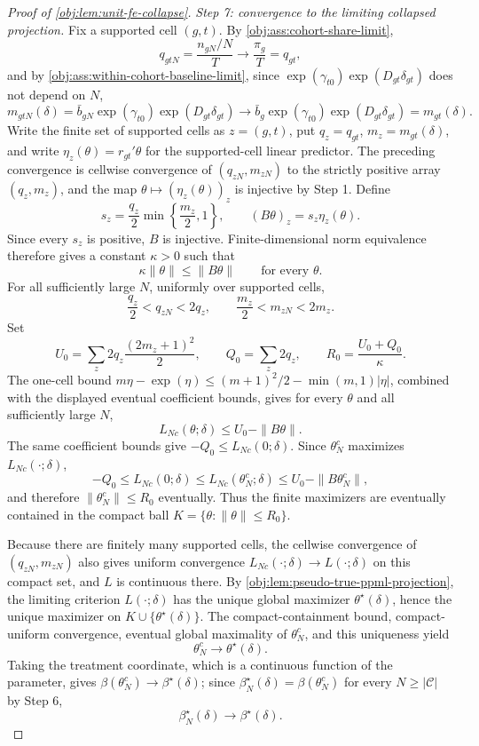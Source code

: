 \begin{proof}[Proof of \cref{obj:lem:unit-fe-collapse}]
\textit{Step 7: convergence to the limiting collapsed projection.} Fix a supported cell \((g,t)\). By \cref{obj:ass:cohort-share-limit},
\[
q_{gtN}=\frac{n_{gN}/N}{T}\longrightarrow \frac{\pi_g}{T}=q_{gt},
\]
and by \cref{obj:ass:within-cohort-baseline-limit}, since \(\exp(\gamma_{t0})\exp(D_{gt}\delta_{gt})\) does not depend on \(N\),
\[
m_{gtN}(\delta)=\bar b_{gN}\exp(\gamma_{t0})\exp(D_{gt}\delta_{gt})
\longrightarrow
\bar b_g\exp(\gamma_{t0})\exp(D_{gt}\delta_{gt})=m_{gt}(\delta).
\]
Write the finite set of supported cells as \(z=(g,t)\), put \(q_z=q_{gt}\), \(m_z=m_{gt}(\delta)\), and write \(\eta_z(\theta)=r_{gt}'\theta\) for the supported-cell linear predictor. The preceding convergence is cellwise convergence of \((q_{zN},m_{zN})\) to the strictly positive array \((q_z,m_z)\), and the map \(\theta\mapsto(\eta_z(\theta))_z\) is injective by Step 1. Define
\[
s_z=\frac{q_z}{2}\min\!\left\{\frac{m_z}{2},1\right\},
\qquad
(B\theta)_z=s_z\eta_z(\theta) .
\]
Since every \(s_z\) is positive, \(B\) is injective. Finite-dimensional norm equivalence therefore gives a constant \(\kappa>0\) such that
\[
\kappa\|\theta\|\le \|B\theta\|
\qquad\text{for every }\theta .
\]
For all sufficiently large \(N\), uniformly over supported cells,
\[
\frac{q_z}{2}<q_{zN}<2q_z,
\qquad
\frac{m_z}{2}<m_{zN}<2m_z .
\]
Set
\[
U_0=\sum_z 2q_z\frac{(2m_z+1)^2}{2},
\qquad
Q_0=\sum_z 2q_z,
\qquad
R_0=\frac{U_0+Q_0}{\kappa}.
\]
The one-cell bound \(m\eta-\exp(\eta)\le (m+1)^2/2-\min(m,1)|\eta|\), combined with the displayed eventual coefficient bounds, gives for every \(\theta\) and all sufficiently large \(N\),
\[
L_{Nc}(\theta;\delta)\le U_0-\|B\theta\|.
\]
The same coefficient bounds give \(-Q_0\le L_{Nc}(0;\delta)\). Since \(\theta_N^c\) maximizes \(L_{Nc}(\cdot;\delta)\),
\[
-Q_0\le L_{Nc}(0;\delta)
\le L_{Nc}(\theta_N^c;\delta)
\le U_0-\|B\theta_N^c\|,
\]
and therefore \(\|\theta_N^c\|\le R_0\) eventually. Thus the finite maximizers are eventually contained in the compact ball \(K=\{\theta:\|\theta\|\le R_0\}\).

Because there are finitely many supported cells, the cellwise convergence of \((q_{zN},m_{zN})\) also gives uniform convergence \(L_{Nc}(\cdot;\delta)\to L(\cdot;\delta)\) on this compact set, and \(L\) is continuous there. By \cref{obj:lem:pseudo-true-ppml-projection}, the limiting criterion \(L(\cdot;\delta)\) has the unique global maximizer \(\theta^\star(\delta)\), hence the unique maximizer on \(K\cup\{\theta^\star(\delta)\}\). The compact-containment bound, compact-uniform convergence, eventual global maximality of \(\theta_N^c\), and this uniqueness yield
\[
\theta_N^c\longrightarrow\theta^\star(\delta).
\]
Taking the treatment coordinate, which is a continuous function of the parameter, gives \(\beta(\theta_N^c)\to\beta^\star(\delta)\); since \(\beta_N^\star(\delta)=\beta(\theta_N^c)\) for every \(N\ge|\mathcal C|\) by Step 6,
\[
\beta_N^\star(\delta)\longrightarrow\beta^\star(\delta).
\]


\end{proof}
